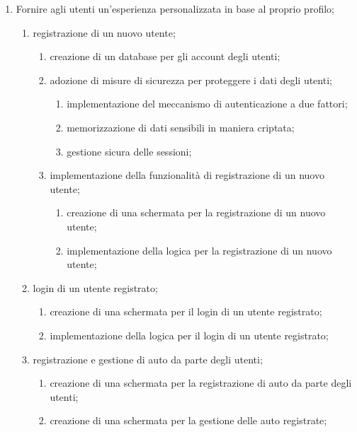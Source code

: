 \documentclass[a4paper,12pt]{article}
\begin{document}
\begin{enumerate}
    \item Fornire agli utenti un'esperienza personalizzata in base al proprio profilo;
    \begin{enumerate}
        \item registrazione di un nuovo utente;
        \begin{enumerate}
            \item creazione di un database per gli account degli utenti;
            \item adozione di misure di sicurezza per proteggere i dati degli utenti;
            \begin{enumerate}
                \item implementazione del meccanismo di autenticazione a due fattori;
                \item memorizzazione di dati sensibili in maniera criptata;
                \item gestione sicura delle sessioni;
            \end{enumerate}
            \item implementazione della funzionalità di registrazione di un nuovo utente;
            \begin{enumerate}
                \item creazione di una schermata per la registrazione di un nuovo utente;
                \item implementazione della logica per la registrazione di un nuovo utente;
            \end{enumerate}
        \end{enumerate}
        \item login di un utente registrato;
        \begin{enumerate}
            \item creazione di una schermata per il login di un utente registrato;
            \item implementazione della logica per il login di un utente registrato;
        \end{enumerate}
        \item registrazione e gestione di auto da parte degli utenti;
        \begin{enumerate}
            \item creazione di una schermata per la registrazione di auto da parte degli utenti;
            \item creazione di una schermata per la gestione delle auto registrate;

\end{enumerate}
\end{enumerate}
\end{enumerate}
\end{document}
